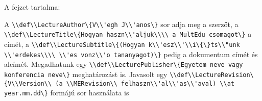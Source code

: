 {
A fejzet tartalma:

A \lstinline|\\def\\LectureAuthor\{V\\'egh J\\'anos\}| sor adja meg a szerzőt,
a \lstinline|\\def\\LectureTitle\{Hogyan haszn\\'aljuk\\\\ a MultEdu csomagot\}|
a címét, a \lstinline|\\def\\LectureSubtitle\{(Hogyan k\\'esz\\'\\i\{\}ts\\"unk \\'erdekes\\\\ \\'es vonz\\'o tananyagot)\}| pedig a dokumentum címét és alcímét.
Megadhatunk egy \lstinline|\\def\\LecturePublisher\{Egyetem neve vagy konferencia neve\}| meghatározást is.
Javasolt egy \lstinline|\\def\\LectureRevision\{V\\Version\\ (a \\MERevision\\ felhaszn\\'al\\'as\\'aval) \\at year.mm.dd\}| formájú sor használata is

}

